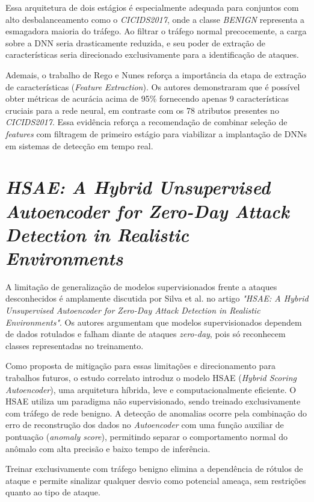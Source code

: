 Essa arquitetura de dois estágios é especialmente adequada para conjuntos com alto desbalanceamento como o \textit{CICIDS2017}, onde a classe \textit{BENIGN} representa a esmagadora maioria do tráfego. Ao filtrar o tráfego normal precocemente, a carga sobre a DNN seria drasticamente reduzida, e seu poder de extração de características seria direcionado exclusivamente para a identificação de ataques.

Ademais, o trabalho de Rego e Nunes reforça a importância da etapa de extração de características (\textit{Feature Extraction}). Os autores demonstraram que é possível obter métricas de acurácia acima de 95\% fornecendo apenas 9 características cruciais para a rede neural, em contraste com os 78 atributos presentes no \textit{CICIDS2017}. Essa evidência reforça a recomendação de combinar seleção de \textit{features} com filtragem de primeiro estágio para viabilizar a implantação de DNNs em sistemas de detecção em tempo real.

\section{\textit{HSAE: A Hybrid Unsupervised Autoencoder for Zero-Day Attack Detection in Realistic Environments}}

A limitação de generalização de modelos supervisionados frente a ataques desconhecidos é amplamente discutida por Silva et al. \cite{silva_hsae} no artigo \textit{"HSAE: A Hybrid Unsupervised Autoencoder for Zero-Day Attack Detection in Realistic Environments"}. Os autores argumentam que modelos supervisionados dependem de dados rotulados e falham diante de ataques \textit{zero-day}, pois só reconhecem classes representadas no treinamento.

Como proposta de mitigação para essas limitações e direcionamento para trabalhos futuros, o estudo correlato introduz o modelo HSAE (\textit{Hybrid Scoring Autoencoder}), uma arquitetura híbrida, leve e computacionalmente eficiente. O HSAE utiliza um paradigma não supervisionado, sendo treinado exclusivamente com tráfego de rede benigno. A detecção de anomalias ocorre pela combinação do erro de reconstrução dos dados no \textit{Autoencoder} com uma função auxiliar de pontuação (\textit{anomaly score}), permitindo separar o comportamento normal do anômalo com alta precisão e baixo tempo de inferência.

Treinar exclusivamente com tráfego benigno elimina a dependência de rótulos de ataque e permite sinalizar qualquer desvio como potencial ameaça, sem restrições quanto ao tipo de ataque.

